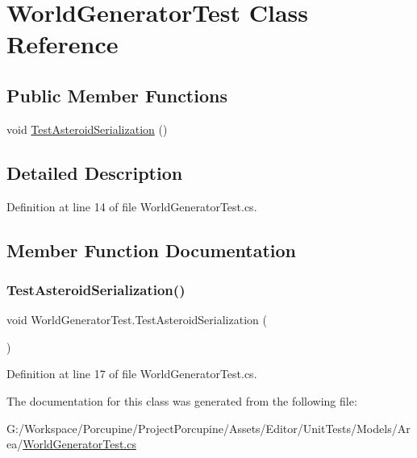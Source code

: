 \hypertarget{class_world_generator_test}{}\section{World\+Generator\+Test Class Reference}
\label{class_world_generator_test}
\subsection*{Public Member Functions}
\begin{DoxyCompactItemize}
\item 
void \hyperlink{class_world_generator_test_a9f98e3163dd075470cbfade3efe4a235}{Test\+Asteroid\+Serialization} ()
\end{DoxyCompactItemize}


\subsection{Detailed Description}


Definition at line 14 of file World\+Generator\+Test.\+cs.



\subsection{Member Function Documentation}
\mbox{\label{class_world_generator_test_a9f98e3163dd075470cbfade3efe4a235}} 
\subsubsection{\texorpdfstring{Test\+Asteroid\+Serialization()}{TestAsteroidSerialization()}}
{\footnotesize\ttfamily void World\+Generator\+Test.\+Test\+Asteroid\+Serialization (\begin{DoxyParamCaption}{ }\end{DoxyParamCaption})}



Definition at line 17 of file World\+Generator\+Test.\+cs.



The documentation for this class was generated from the following file\+:\begin{DoxyCompactItemize}
\item 
G\+:/\+Workspace/\+Porcupine/\+Project\+Porcupine/\+Assets/\+Editor/\+Unit\+Tests/\+Models/\+Area/\hyperlink{_world_generator_test_8cs}{World\+Generator\+Test.\+cs}\end{DoxyCompactItemize}
